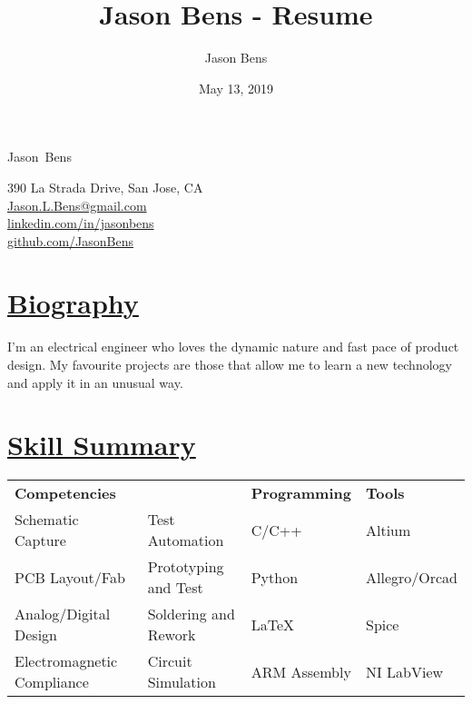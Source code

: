 \documentclass[a4paper, 11pt]{article}
\title{Jason Bens - Resume}
\author{Jason Bens}
\date{May 13, 2019}
\makeatletter
\newcommand {\firstname} {Jason}
\newcommand {\lastname} {Bens}
\newcommand {\address} {390 La Strada Drive, San Jose, CA}
\newcommand {\phone} {\mbox{1-403-845-9125}}
\newcommand {\email} {\url{Jason.L.Bens@gmail.com}}
\newcommand {\linkedin} {\url{linkedin.com/in/jasonbens}}
\newcommand {\github} {\url{github.com/JasonBens}}
\newcommand {\careers} {\url{careers.stackoverflow.com/JasonBens}}
\makeatother
\begin{document}


\begin{minipage}[t]{0.4\textwidth}  
  \begin{flushright}
    {\Huge \firstname~\lastname}
  \end{flushright}
\end{minipage}
\hfill
\begin{minipage}{0.42\textwidth}
  \begin{flushright}
    \address \\
    \email \\
    \linkedin \\
    \github \\
  \end{flushright}
\end{minipage}

\hrulefill

\section{\underline{Biography}}
I'm an electrical engineer who loves the dynamic nature and fast pace of product design. My favourite projects are those that allow me to learn a new technology and apply it in an unusual way.

\section{\underline{Skill Summary}}
  \begin{tabularx}{\textwidth}{l l l l}
    \textbf{Competencies} &  & \textbf{Programming} & \textbf{Tools}\\
    Schematic Capture & Test Automation & C/C++ & Altium\\
    PCB Layout/Fab & Prototyping and Test & Python & Allegro/Orcad\\
    Analog/Digital Design & Soldering and Rework & \LaTeX & Spice\\
    Electromagnetic Compliance & Circuit Simulation & ARM Assembly & NI LabView\\
  \end{tabularx}
  
\end{document}
